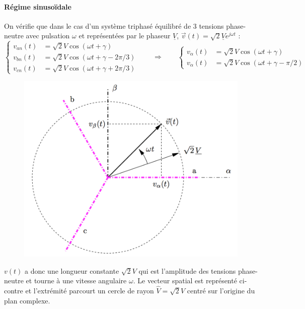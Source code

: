 		\paragraph{Régime sinusoïdale} \quad On vérifie que dans le cas d'un système triphasé équilibré de 3 tensions phase-neutre avec pulsation $\omega$ et représentées par le phaseur $\underline{V}$, $\vec{v}(t) = \sqrt{2}\underline{V}e^{j\omega t}$ :
		\begin{equation}
			\left\{
			\begin{aligned}
			v_{an}(t) &= \sqrt{2}V \cos (\omega t +\gamma)\\
			v_{bn}(t) &= \sqrt{2}V \cos (\omega t +\gamma - 2\pi /3)\\
			v_{cn}(t) &= \sqrt{2}V \cos (\omega t +\gamma + 2\pi /3)
			\end{aligned}
			\right.
			\qquad \Rightarrow \qquad
			\left\{ 
			\begin{aligned}
			v_\alpha (t) &= \sqrt{2}V\cos (\omega t + \gamma)\\
			v_\alpha (t) &= \sqrt{2}V\cos (\omega t + \gamma - \pi /2)
			\end{aligned}
			\right.
		\end{equation}
		
		\begin{figure}
		\vspace{-5mm}
		\includegraphics[scale=0.25]{ch4/26}
		\end{figure}
		$v(t)$ a donc une longueur constante $\sqrt{2}V$ qui est l'amplitude des tensions phase-neutre et tourne à une vitesse angulaire $\omega$. Le vecteur spatial est représenté ci-contre et l'extrémité parcourt un cercle de rayon $\hat{V} =\sqrt{2}V$ centré sur l'origine du plan complexe. \\\\\\\\\\
		
